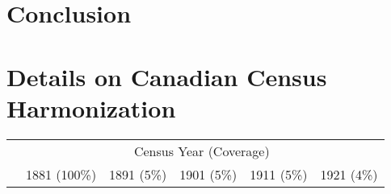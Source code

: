 \documentclass[12pt]{article}
\begin{document}
\section{Conclusion}

\newpage



\newpage 
\appendix
\section{Details on Canadian Census Harmonization}
\begin{table}[!h]
    \centering 
    \begin{tabular}{lccccc}
    \hhline{======} 
                & \multicolumn{5}{c}{Census Year (Coverage)} \\
                & 1881 (100\%) & 1891 (5\%) & 1901 (5\%) & 1911 (5\%) & 1921 (4\%) \\
    \hline 
    \end{tabular}    
\end{table}
\end{document}
